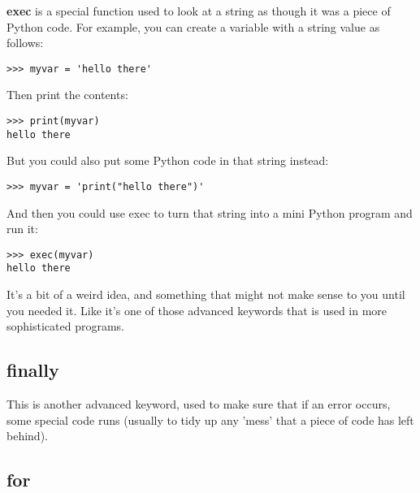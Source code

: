 \textbf{exec} is a special function used to look at a string as though it was a piece of Python code. For example, you can create a variable with a string value as follows:

\begin{Verbatim}[frame=single]
>>> myvar = 'hello there'
\end{Verbatim}

\noindent
Then print the contents:

\begin{Verbatim}[frame=single]
>>> print(myvar)
hello there
\end{Verbatim}

\noindent
But you could also put some Python code in that string instead:

\begin{Verbatim}[frame=single]
>>> myvar = 'print("hello there")'
\end{Verbatim}

\noindent
And then you could use exec to turn that string into a mini Python program and run it:

\begin{Verbatim}[frame=single]
>>> exec(myvar)
hello there
\end{Verbatim}

It's a bit of a weird idea, and something that might not make sense to you until you needed it.  Like  it's one of those advanced keywords that is used in more sophisticated programs.

\subsection*{finally}

This is another advanced keyword, used to make sure that if an error occurs, some special code runs (usually to tidy up any 'mess' that a piece of code has left behind).

\subsection*{for}

